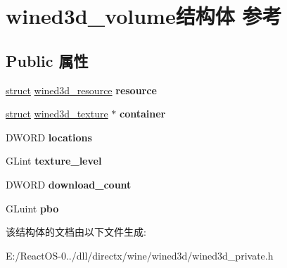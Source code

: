 \hypertarget{structwined3d__volume}{}\section{wined3d\+\_\+volume结构体 参考}
\label{structwined3d__volume}
\subsection*{Public 属性}
\begin{DoxyCompactItemize}
\item 
\mbox{\label{structwined3d__volume_ad1e5fd157b52a3eed4689e80cecfe9e9}} 
\hyperlink{interfacestruct}{struct} \hyperlink{structwined3d__resource}{wined3d\+\_\+resource} {\bfseries resource}
\item 
\mbox{\label{structwined3d__volume_a62c2e4ce14ab5fd6ab93d1530bf32609}} 
\hyperlink{interfacestruct}{struct} \hyperlink{structwined3d__texture}{wined3d\+\_\+texture} $\ast$ {\bfseries container}
\item 
\mbox{\label{structwined3d__volume_adf4002abb50ce0d8011c9d393e64e422}} 
D\+W\+O\+RD {\bfseries locations}
\item 
\mbox{\label{structwined3d__volume_a8e7d7b53aac3bc5923a06712478b627a}} 
G\+Lint {\bfseries texture\+\_\+level}
\item 
\mbox{\label{structwined3d__volume_a8525721656ef9f0114075587e6f8b2ed}} 
D\+W\+O\+RD {\bfseries download\+\_\+count}
\item 
\mbox{\label{structwined3d__volume_a248a803820ae1a0277b87f1e0b9d3c0b}} 
G\+Luint {\bfseries pbo}
\end{DoxyCompactItemize}


该结构体的文档由以下文件生成\+:\begin{DoxyCompactItemize}
\item 
E\+:/\+React\+O\+S-\/0../dll/directx/wine/wined3d/wined3d\+\_\+private.\+h\end{DoxyCompactItemize}
